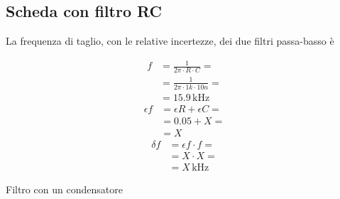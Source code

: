 \documentclass{article}
\begin{document}
		\subsection{Scheda con filtro RC}
			La frequenza di taglio, con le relative incertezze, dei due filtri passa-basso è
			\newline
			\begin{minipage}[t]{0.5\textwidth}
				\centering
				\begin{equation*}
					\begin{split}
						f &= \frac{1}{2 \pi \cdot R \cdot C} = \\
						  &= \frac{1}{2 \pi \cdot 1k \cdot 10n} = \\
						  &= 15.9 \, \mathrm{kHz}
					\end{split}
				\end{equation*}
				\newline
				\begin{equation*}
					\begin{split}
						\epsilon f &= \epsilon R + \epsilon C = \\
								   &= 0.05 + X = \\
								   &= X
					\end{split}
				\end{equation*}
				\newline
				\begin{equation*}
					\begin{split}
						\delta f &= \epsilon f \cdot f = \\
								 &= X \cdot X = \\
								 &= X \, \mathrm{kHz}
					\end{split}
				\end{equation*}
				\newline
				\begin{scriptsize}
					Filtro con un condensatore
				\end{scriptsize}
			\end{minipage}
\end{document}
